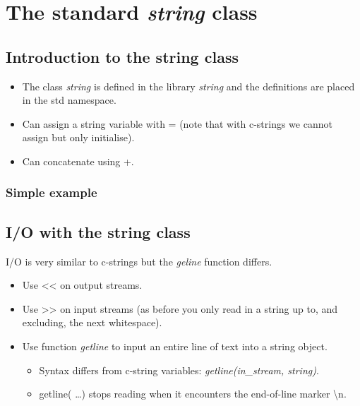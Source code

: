 \section{The standard \emph{string} class}

\subsection{Introduction to the string class}
\begin{itemize}
	\item The class \emph{string} is defined in the library \emph{string} and the definitions are placed in the 
	std namespace.
	\item Can assign a string variable with = (note that with c-strings we cannot assign but only initialise).
	\item Can concatenate using +.
\end{itemize}

\subsubsection*{Simple example}



\subsection{I/O with the string class}
I/O is very similar to c-strings but the \emph{geline} function differs.
\begin{itemize}
	\item Use \textless\textless{} on output streams.
	\item Use \textgreater\textgreater{} on input streams (as before you only read in a string up
	to, and excluding, the next whitespace).
	\item Use function \emph{getline} to input an entire line of text into a string object.
	\begin{itemize}
		\item Syntax differs from c-string variables: \emph{getline(in\_stream, string)}.
		\item getline( \ldots ) stops reading when it encounters the end-of-line marker \textbackslash n.
	\end{itemize}
\end{itemize}

